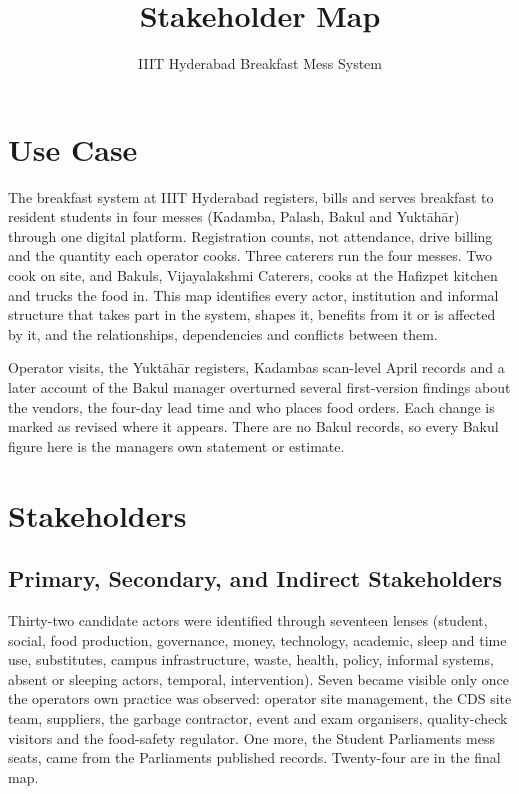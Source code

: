 \documentclass[
  10pt,
  table]{article}
\title{Stakeholder Map}
\subtitle{IIIT Hyderabad Breakfast Mess System}
\author{}
\date{}
\makeatletter
\gdef\psubtitle{}
\renewcommand{\maketitle}{%
  \begingroup\raggedright
  {\color{pblue}\fontsize{24}{27}\selectfont\bfseries \@title\par}
  \vspace{3pt}{\color{pblue}\rule{\linewidth}{2.4pt}}\par\vspace{5pt}
  {\color{pslate}\large \psubtitle\par}
  \vspace{4pt}
  \endgroup}
\makeatother
\begin{document}
\maketitle

\renewcommand*\contentsname{Contents}
{
\hypersetup{linkcolor=pslate}
\setcounter{tocdepth}{2}
\tableofcontents
}
\section{Use Case}\label{use-case}

The breakfast system at IIIT Hyderabad registers, bills and serves breakfast to resident students in four messes (Kadamba, Palash, Bakul and Yuktāhār) through one digital platform. Registration counts, not attendance, drive billing and the quantity each operator cooks. Three caterers run the four messes. Two cook on site, and Bakul\textquotesingle s, Vijayalakshmi Caterers, cooks at the Hafizpet kitchen and trucks the food in. This map identifies every actor, institution and informal structure that takes part in the system, shapes it, benefits from it or is affected by it, and the relationships, dependencies and conflicts between them.

Operator visits, the Yuktāhār registers, Kadamba\textquotesingle s scan-level April records and a later account of the Bakul manager overturned several first-version findings about the vendors, the four-day lead time and who places food orders. Each change is marked as revised where it appears. There are no Bakul records, so every Bakul figure here is the manager\textquotesingle s own statement or estimate.

\section{Stakeholders}\label{stakeholders}

\subsection{Primary, Secondary, and Indirect Stakeholders}\label{primary-secondary-and-indirect-stakeholders}

Thirty-two candidate actors were identified through seventeen lenses (student, social, food production, governance, money, technology, academic, sleep and time use, substitutes, campus infrastructure, waste, health, policy, informal systems, absent or sleeping actors, temporal, intervention). Seven became visible only once the operators\textquotesingle{} own practice was observed: operator site management, the CDS site team, suppliers, the garbage contractor, event and exam organisers, quality-check visitors and the food-safety regulator. One more, the Student Parliament\textquotesingle s mess seats, came from the Parliament\textquotesingle s published records. Twenty-four are in the final map.
\end{document}
